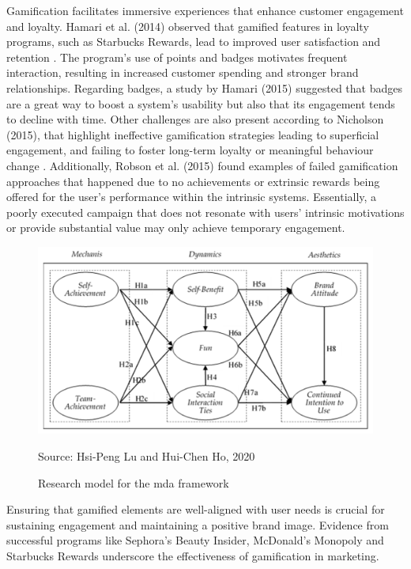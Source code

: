 Gamification facilitates immersive experiences that enhance customer engagement and loyalty. 
Hamari et al. (2014) observed that gamified features in loyalty programs, such as Starbucks Rewards, lead to improved user satisfaction and retention \cite{doesItWork}. 
The program’s use of points and badges motivates frequent interaction, resulting in increased customer spending and stronger brand relationships. 
Regarding badges, a study by Hamari (2015) suggested that badges are a great way to boost a system's usability but also that its engagement tends to decline with time\cite{badges}. 
Other challenges are also present according to Nicholson (2015), that highlight ineffective gamification strategies leading to superficial engagement, and failing to foster long-term loyalty or meaningful behaviour change \cite{nicholson2015}. 
Additionally, Robson et al. (2015) found examples of failed gamification approaches that happened due to no achievements or extrinsic rewards being offered for the user's performance within the intrinsic systems. 
Essentially, a poorly executed campaign that does not resonate with users' intrinsic motivations or provide substantial value may only achieve temporary engagement. 
\begin{figure}[htbp]
  \centering
  \includegraphics[width=\textwidth]{Media/sustainability2.png}
  \caption{Research model for the \acrshort{mda} framework}
  \label{fig:explainedDataChart}
{\raggedright \small{Source: Hsi-Peng Lu and Hui-Chen Ho, 2020}\par}
\end{figure}
Ensuring that gamified elements are well-aligned with user needs is crucial for sustaining engagement and maintaining a positive brand image.
Evidence from successful programs like Sephora’s Beauty Insider, McDonald's Monopoly and Starbucks Rewards underscore the effectiveness of gamification in marketing.

